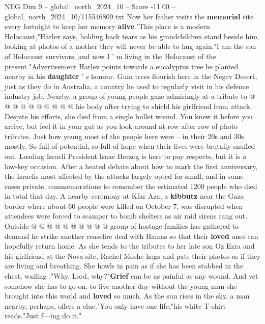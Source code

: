 \begin{textsample}{NEG Dim 9 – global\_north\_2024\_10 – Score -11.00 – global\_north\_2024\_10/115546809.txt}
Now her father visits the \textbf{memorial} site every fortnight to keep her memory \textbf{alive}."This place is a modern Holocaust,"Harlev says, holding back tears as his grandchildren stand beside him, looking at photos of a mother they will never be able to hug again."I am the son of Holocaust survivors, and now I ' m living in the Holocaust of the present."Advertisement Harlev points towards a eucalyptus tree he planted nearby in his \textbf{daughter} ' s honour.
Gum trees flourish here in the Negev Desert, just as they do in Australia, a country he used to regularly visit in his defence industry job.
Nearby, a group of young people gaze admiringly at a tribute to @ @ @ @ @ @ @ @ @ @ his body after trying to shield his girlfriend from attack.
Despite his efforts, she died from a single bullet wound.
You knew it before you arrive, but feel it in your gut as you look around at row after row of photo tributes.
Just how young most of the people here were -- in their 20s and 30s mostly.
So full of potential, so full of hope when their lives were brutally snuffed out.
Loading Israeli President Isaac Herzog is here to pay respects, but it is a low-key occasion.
After a heated debate about how to mark the first anniversary, the Israelis most affected by the attacks largely opted for small, and in some cases private, commemorations to remember the estimated 1200 people who died in total that day.
A nearby ceremony at Kfar Aza, a \textbf{kibbutz} near the Gaza border where about 60 people were killed on October 7, was disrupted when attendees were forced to scamper to bomb shelters as air raid sirens rang out.
Outside @ @ @ @ @ @ @ @ @ @ group of hostage families has gathered to demand he strike another ceasefire deal with Hamas so that their \textbf{loved} ones can hopefully return home.
As she tends to the tributes to her late son Oz Ezra and his girlfriend at the Nova site, Rachel Moshe hugs and pats their photos as if they are living and breathing.
She howls in pain as if she has been stabbed in the chest, wailing :"Why, Lord, why?"\textbf{Grief} can be as painful as any wound.
And yet somehow she has to go on, to live another day without the young man she brought into this world and \textbf{loved} so much.
As the sun rises in the sky, a man nearby, perhaps, offers a clue."You only have one life,"his white T-shirt reads."Just f---ing do it."

\end{textsample}
